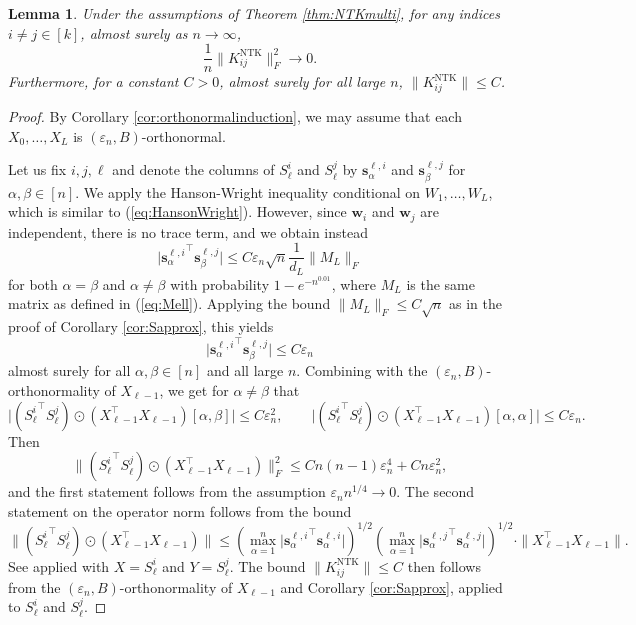 \documentclass{article}
\newtheorem{lemma}[theorem]{Lemma}
\theoremstyle{definition}
\newcommand{\NTK}{\text{NTK}}
\newcommand{\w}{\mathbf{w}}
\newcommand{\s}{\mathbf{s}}
\renewcommand{\a}{\alpha}
\renewcommand{\b}{\beta}
\newcommand{\eps}{\varepsilon}
\newcommand{\1}{\mathbf{1}}
\begin{document}
\begin{lemma}\label{lemma:NTKFapproxmulti}
Under the assumptions of Theorem \ref{thm:NTKmulti},
for any indices $i \neq j \in [k]$, almost surely as $n
\to \infty$,
\[\frac{1}{n}\|K_{ij}^\NTK\|_F^2 \to 0.\]
Furthermore, for a constant $C>0$, almost surely for all large $n$,
$\|K_{ij}^\NTK\| \leq C$.
\end{lemma}
\begin{proof}
By Corollary \ref{cor:orthonormalinduction}, we may assume that each
$X_0,\ldots,X_L$ is $(\eps_n,B)$-orthonormal.

Let us fix $i,j,\ell$ and denote the columns of $S_\ell^i$ and $S_\ell^j$ by
$\s_\a^{\ell,i}$ and $\s_\b^{\ell,j}$ for $\a,\b \in [n]$.
We apply the Hanson-Wright inequality conditional on $W_1,\ldots,W_L$, which is
similar to (\ref{eq:HansonWright}). However, since $\w_i$ and $\w_j$ are
independent, there is no trace term, and we obtain instead
\[\Big|{\s_\a^{\ell,i}}^\top \s_\b^{\ell,j}\Big| \leq C\eps_n\sqrt{n}
\frac{1}{d_L}\|M_L\|_F\]
for both $\a=\b$ and $\a \neq \b$ with probability $1-e^{-n^{0.01}}$,
where $M_L$ is the same matrix as defined in (\ref{eq:Mell}).
Applying the bound $\|M_L\|_F \leq C\sqrt{n}$ as
in the proof of Corollary \ref{cor:Sapprox}, this yields
\[\Big|{\s_\a^{\ell,i}}^\top \s_\b^{\ell,j}\Big| \leq C\eps_n\]
almost surely for all $\a,\b \in [n]$ and all large $n$. Combining with the
$(\eps_n,B)$-orthonormality of $X_{\ell-1}$, we get for $\a \neq \b$ that
\[\Big|({S_\ell^i}^\top S_\ell^j) \odot (X_{\ell-1}^\top X_{\ell-1})[\a,\b]\Big|
\leq C\eps_n^2, \qquad
\Big|({S_\ell^i}^\top S_\ell^j) \odot (X_{\ell-1}^\top X_{\ell-1})[\a,\a]\Big|
\leq C\eps_n.\]
Then
\[\|({S_\ell^i}^\top S_\ell^j) \odot (X_{\ell-1}^\top X_{\ell-1})\|_F^2
\leq Cn(n-1)\eps_n^4+Cn\eps_n^2,\]
and the first statement follows from the assumption $\eps_n n^{1/4} \to 0$.
The second statement on the operator norm follows from the bound
\[\|({S_\ell^i}^\top {S_\ell^j}) \odot (X_{\ell-1}^\top X_{\ell-1})\|
\leq \left(\max_{\a=1}^n \Big|{\s^{\ell,i}_{\a}}^\top
{\s^{\ell,i}_{\a}}\Big|\right)^{1/2}
\left(\max_{\a=1}^n \Big|{\s^{\ell,j}_\a}^\top
\s^{\ell,j}_\a\Big|\right)^{1/2} \cdot \|X_{\ell-1}^\top X_{\ell-1}\|.\]
See \cite[Eq.\ (3.7.9)]{johnson1990matrix} applied with $X=S_\ell^i$ and
$Y=S_\ell^j$. The bound $\|K_{ij}^\NTK\| \leq C$ then follows from
the $(\eps_n,B)$-orthonormality of
$X_{\ell-1}$ and Corollary \ref{cor:Sapprox}, applied to $S_\ell^i$ and
$S_\ell^j$.
\end{proof}
\end{document}
